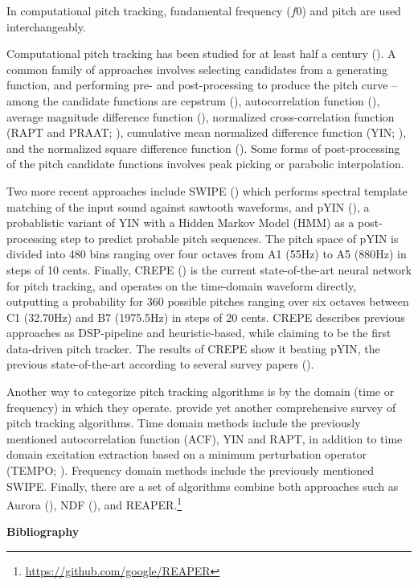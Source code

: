\documentclass[letter,11pt]{report}
\begin{document}
In computational pitch tracking, fundamental frequency ($\mathit{f0}$) and pitch are used interchangeably.

\vfill
\clearpage

Computational pitch tracking has been studied for at least half a century (\cite{nollcepstrum}). A common family of approaches involves selecting candidates from a generating function, and performing pre- and post-processing to produce the pitch curve -- among the candidate functions are cepstrum (\cite{nollcepstrum}), autocorrelation function (\cite{acorr}), average magnitude difference function (\cite{amdf}), normalized cross-correlation function (RAPT and PRAAT; \cite{rapt, praat}), cumulative mean normalized difference function (YIN; \cite{yin}), and the normalized square difference function (\cite{mpm}). Some forms of post-processing of the pitch candidate functions involves peak picking or parabolic interpolation.

Two more recent approaches include SWIPE (\cite{swipe}) which performs spectral template matching of the input sound against sawtooth waveforms, and pYIN (\cite{pyin}), a probablistic variant of YIN with a Hidden Markov Model (HMM) as a post-processing step to predict probable pitch sequences. The pitch space of pYIN is divided into 480 bins ranging over four octaves from A1 (55Hz) to A5 (880Hz) in steps of 10 cents. Finally, CREPE (\cite{crepe}) is the current state-of-the-art neural network for pitch tracking, and operates on the time-domain waveform directly, outputting a probability for 360 possible pitches ranging over six octaves between C1 (32.70Hz) and B7 (1975.5Hz) in steps of 20 cents. CREPE describes previous approaches as DSP-pipeline and heuristic-based, while claiming to be the first data-driven pitch tracker. The results of CREPE show it beating pYIN, the previous state-of-the-art according to several survey papers (\cite{comparison1, comparison2}).

Another way to categorize pitch tracking algorithms is by the domain (time or frequency) in which they operate. \textcite{comparison3} provide yet another comprehensive survey of pitch tracking algorithms. Time domain methods include the previously mentioned autocorrelation function (ACF), YIN and RAPT, in addition to time domain excitation extraction based on a minimum perturbation operator (TEMPO; \cite{tempo1, tempo2}). Frequency domain methods include the previously mentioned SWIPE. Finally, there are a set of algorithms combine both approaches such as Aurora (\cite{aurora}), NDF (\cite{ndf}), and REAPER.\footnote{\href{https://github.com/google/REAPER}{https://github.com/google/REAPER}}

\vfill
\clearpage

\noindent\LARGE{\textbf{Bibliography}}\\

\vspace{-0.5em}

\printbibliography[heading=none]
\end{document}
